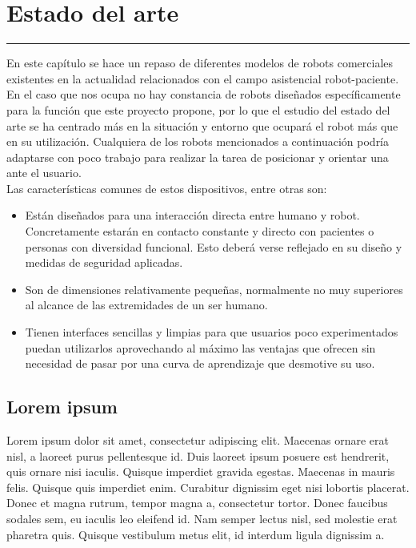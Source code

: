 \chapter{Estado del arte} \label{chap:estadoarte}
\hrule
\vspace{3mm}

En este capítulo se hace un repaso de diferentes modelos de robots comerciales existentes en la actualidad relacionados con el campo asistencial robot-paciente. En el caso que nos ocupa no hay constancia de robots diseñados específicamente para la función que este proyecto propone, por lo que el estudio del estado del arte se ha centrado más en la situación y entorno que ocupará el robot más que en su utilización. Cualquiera de los robots mencionados a continuación podría adaptarse con poco trabajo para realizar la tarea de posicionar y orientar una  ante el usuario.
\\

Las características comunes de estos dispositivos, entre otras son: \begin{itemize}
    \item Están diseñados para una interacción directa entre humano y robot. Concretamente estarán en contacto constante y directo con pacientes o personas con diversidad funcional. Esto deberá verse reflejado en su diseño y medidas de seguridad aplicadas.
    \item Son de dimensiones relativamente pequeñas, normalmente no muy superiores al alcance de las extremidades de un ser humano.
    \item Tienen interfaces sencillas y limpias para que usuarios poco experimentados puedan utilizarlos aprovechando al máximo las ventajas que ofrecen sin necesidad de pasar por una curva de aprendizaje que desmotive su uso.
\end{itemize}


\section{Lorem ipsum}
Lorem ipsum dolor sit amet, consectetur adipiscing elit. Maecenas ornare erat nisl, a laoreet purus pellentesque id. Duis laoreet ipsum posuere est hendrerit, quis ornare nisi iaculis. Quisque imperdiet gravida egestas. Maecenas in mauris felis. Quisque quis imperdiet enim. Curabitur dignissim eget nisi lobortis placerat. Donec et magna rutrum, tempor magna a, consectetur tortor. Donec faucibus sodales sem, eu iaculis leo eleifend id. Nam semper lectus nisl, sed molestie erat pharetra quis. Quisque vestibulum metus elit, id interdum ligula dignissim a.


